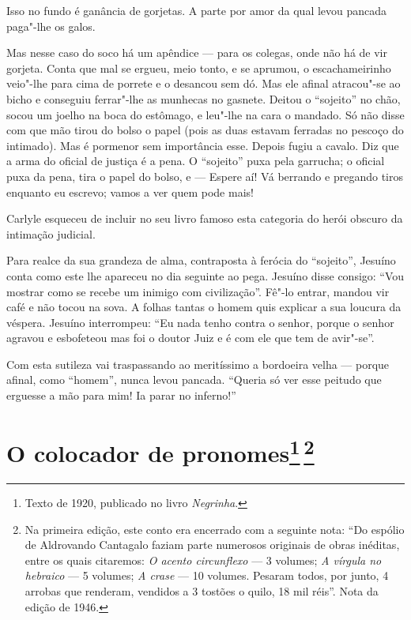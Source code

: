 Isso no fundo é ganância de gorjetas. A parte por amor da qual levou
pancada paga"-lhe os galos.

Mas nesse caso do soco há um apêndice --- para os colegas, onde não há
de vir gorjeta. Conta que mal se ergueu, meio tonto, e se aprumou, o
escachameirinho veio"-lhe para cima de porrete e o desancou sem dó. Mas
ele afinal atracou"-se ao bicho e conseguiu ferrar"-lhe as munhecas no
gasnete. Deitou o ``sojeito'' no chão, socou um joelho na boca do
estômago, e leu"-lhe na cara o mandado. Só não disse com que mão tirou do
bolso o papel (pois as duas estavam ferradas no pescoço do intimado).
Mas é pormenor sem importância esse. Depois fugiu a cavalo. Diz que a
arma do oficial de justiça é a pena. O ``sojeito'' puxa pela garrucha; o
oficial puxa da pena, tira o papel do bolso, e --- Espere aí! Vá
berrando e pregando tiros enquanto eu escrevo; vamos a ver quem pode
mais!

Carlyle esqueceu de incluir no seu livro famoso esta categoria do herói
obscuro da intimação judicial.

Para realce da sua grandeza de alma, contraposta à ferócia do
``sojeito'', Jesuíno conta como este lhe apareceu no dia seguinte ao
pega. Jesuíno disse consigo: ``Vou mostrar como se recebe um inimigo com
civilização''. Fê"-lo entrar, mandou vir café e não tocou na sova. A
folhas tantas o homem quis explicar a sua loucura da véspera. Jesuíno
interrompeu: ``Eu nada tenho contra o senhor, porque o senhor agravou e
esbofeteou mas foi o doutor Juiz e é com ele que tem de avir"-se''.

Com esta sutileza vai traspassando ao meritíssimo a bordoeira velha ---
porque afinal, como ``homem'', nunca levou pancada. ``Queria só ver esse
peitudo que erguesse a mão para mim! Ia parar no inferno!''

\chapter{O colocador de pronomes\footnote[*]{Texto de 1920, publicado no livro \emph{Negrinha}.}\,\footnote[**]{Na primeira edição, este conto era encerrado
  com a seguinte nota: ``Do espólio de Aldrovando Cantagalo faziam parte
  numerosos originais de obras inéditas, entre os quais citaremos:
  \emph{O acento circunflexo} --- 3 volumes; \emph{A vírgula no
  hebraico} --- 5 volumes; \emph{A crase} --- 10 volumes. Pesaram todos,
  por junto, 4 arrobas que renderam, vendidos a 3 tostões o quilo, 18
  mil réis''. Nota da edição de 1946.}}

